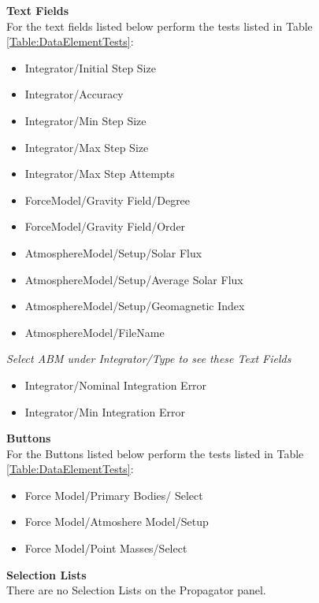 \noindent\textbf{Text Fields}\\

\noindent For the text fields listed below perform the tests listed
in Table \ref{Table:DataElementTests}:
%
\begin{itemize}
    \item Integrator/Initial Step Size
    \item Integrator/Accuracy
    \item Integrator/Min Step Size
    \item Integrator/Max Step Size
    \item Integrator/Max Step Attempts
    \item ForceModel/Gravity Field/Degree
    \item ForceModel/Gravity Field/Order
    \item AtmosphereModel/Setup/Solar Flux
    \item AtmosphereModel/Setup/Average Solar Flux
    \item AtmosphereModel/Setup/Geomagnetic Index
    \item AtmosphereModel/FileName
\end{itemize}

\noindent \emph{Select ABM under Integrator/Type to see these Text
Fields}
\begin{itemize}
    \item Integrator/Nominal Integration Error
    \item Integrator/Min Integration Error
\end{itemize}


\noindent\textbf{Buttons}\\

\noindent For the Buttons listed below perform the tests listed in
Table \ref{Table:DataElementTests}:
%
\begin{itemize}
    \item Force Model/Primary Bodies/ Select
    \item Force Model/Atmoshere Model/Setup
    \item Force Model/Point Masses/Select
\end{itemize}



\noindent\textbf{Selection Lists}\\

There are no Selection Lists on the Propagator panel.\\



